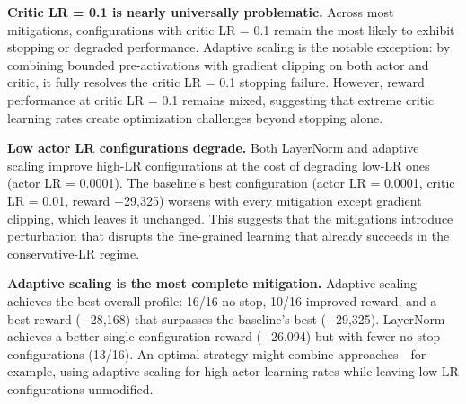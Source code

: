 \textbf{Critic LR = 0.1 is nearly universally problematic.} Across most mitigations, configurations with critic LR = 0.1 remain the most likely to exhibit stopping or degraded performance. Adaptive scaling is the notable exception: by combining bounded pre-activations with gradient clipping on both actor and critic, it fully resolves the critic LR = 0.1 stopping failure. However, reward performance at critic LR = 0.1 remains mixed, suggesting that extreme critic learning rates create optimization challenges beyond stopping alone.

\textbf{Low actor LR configurations degrade.} Both LayerNorm and adaptive scaling improve high-LR configurations at the cost of degrading low-LR ones (actor LR = 0.0001). The baseline's best configuration (actor LR = 0.0001, critic LR = 0.01, reward $-$29,325) worsens with every mitigation except gradient clipping, which leaves it unchanged. This suggests that the mitigations introduce perturbation that disrupts the fine-grained learning that already succeeds in the conservative-LR regime.

\textbf{Adaptive scaling is the most complete mitigation.} Adaptive scaling achieves the best overall profile: 16/16 no-stop, 10/16 improved reward, and a best reward ($-$28,168) that surpasses the baseline's best ($-$29,325). LayerNorm achieves a better single-configuration reward ($-$26,094) but with fewer no-stop configurations (13/16). An optimal strategy might combine approaches---for example, using adaptive scaling for high actor learning rates while leaving low-LR configurations unmodified.

